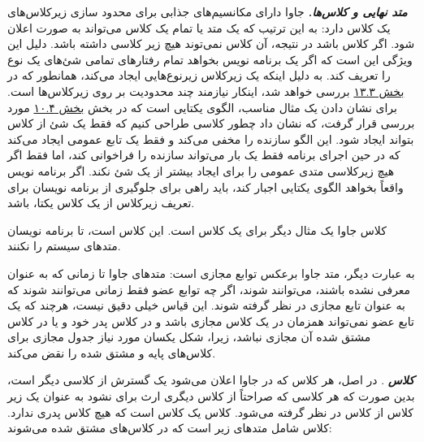 \documentclass[a4paper,12pt]{report}
\newcommand{\lrm}[1]{\textcolor{steelBlue}{\lr{\texttt{#1}}}}
\begin{document}
	
	\textit{\textbf{
			متد نهایی
			 و کلاس‌ها.}}   جاوا دارای مکانسیم‌های جذابی برای محدود سازی زیرکلاس‌های یک کلاس دارد: به این ترتیب که یک متد یا تمام یک کلاس می‌تواند به صورت 
	  اعلان شود. اگر کلاس 
	   باشد در نتیجه، آن کلاس نمی‌توند هیچ زیر کلاسی داشته باشد. دلیل این ویژگی این است که اگر یک برنامه نویس بخواهد تمام رفتارهای تمامی شئ‌های یک نوع را تعریف کند. به دلیل اینکه یک زیرکلاس زیرنوع‌هایی ایجاد می‌کند، همانطور که در 
	\hyperref[sec3:chap13]{
	بخش ۱۳.۳} بررسی خواهد شد، اینکار نیازمند چند محدودیت بر روی زیرکلاس‌ها است. برای نشان دادن یک مثال مناسب، الگوی یکتایی
	است که در بخش 
	\hyperref[sec4:chap10]{
	بخش ۱۰.۴} مورد بررسی قرار گرفت، که نشان داد چطور کلاسی طراحی کنیم که فقط یک شئ
	از کلاس بتواند ایجاد شود. این الگو سازنده را مخفی می‌کند و فقط یک تابع عمومی ایجاد می‌کند که در حین اجرای برنامه فقط یک بار می‌تواند سازنده را فراخوانی کند، اما فقط اگر هیچ زیرکلاسی متدی عمومی را برای ایجاد بیشتر از یک شئ 
	 نکند.
	اگر برنامه نویس واقعاً بخواهد الگوی یکتایی اجبار کند، باید راهی برای جلوگیری از برنامه نویسان برای تعریف زیرکلاس از یک کلاس یکتا، باشد. 
	
	 کلاس جاوا 
	\lrm{java.lang.System}
	یک مثال دیگر برای یک کلاس
	 است. این کلاس 
	 است، تا برنامه نویسان متد‌های سیستم را 
	نکنند.
	
	به عبارت دیگر،‌ متد 
	جاوا برعکس توابع مجازی 
	است: متد‌های جاوا تا زمانی که به عنوان 
	معرفی نشده باشند، می‌توانند 
	 شوند، اگر چه توابع عضو 
	 فقط زمانی می‌توانند 
	  شوند که به عنوان تابع مجازی در نظر گرفته شوند.
	 این قیاس خیلی دقیق نیست، هرچند که یک تابع عضو 
	 نمی‌تواند همزمان در یک کلاس مجازی باشد و در کلاس پدر خود و یا در کلاس مشتق شده آن مجازی نباشد، زیرا،   شکل یکسان مورد نیاز جدول مجازی برای کلاس‌های پایه و مشتق شده را نقض می‌کند. 
	
	
	\textit{\textbf{
	کلاس 
	}}.
	در اصل، هر کلاس که در جاوا اعلان می‌شود یک گسترش
	از کلاسی دیگر است، بدین صورت که هر کلاسی که صراحتاً از کلاس دیگری ارث برای نشود به عنوان یک زیر کلاس از کلاس 
	در نظر گرفته می‌شود.
	کلاس 
	\lrm{Object}
	یک کلاس است که هیچ کلاس پدری ندارد. کلاس 
	\lrm{Object}
	شامل متدهای زیر است که در کلاس‌های مشتق شده 
	\lrm{override}
	می‌شوند:
	
\end{document}
